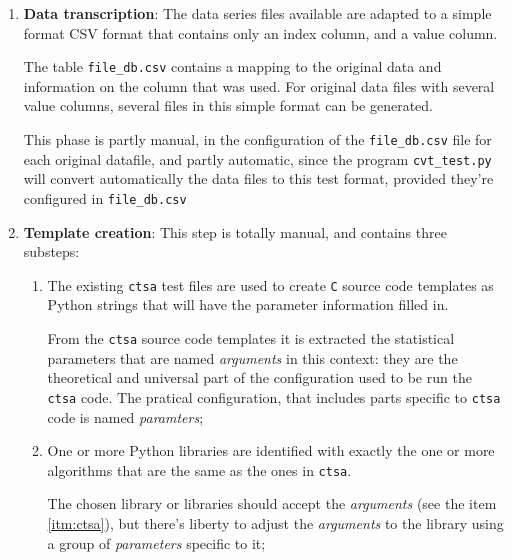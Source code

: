 \documentclass[a4paper,10pt]{article}
\begin{document}
\begin{enumerate}
    \item {\bf Data transcription}: The data series files
        available are adapted to a simple format CSV format that
        contains only an index column, and a value column.

        The table {\tt file\_db.csv} contains a mapping to the
        original data and information on the column that was
        used. For original data files with several value columns,
        several files in this simple format can be generated.

        This phase is partly manual, in the configuration of the
        {\tt file\_db.csv} file for each original datafile, and
        partly automatic, since the program {\tt cvt\_test.py}
        will convert automatically the data files to this test
        format, provided they're configured in {\tt file\_db.csv}

    \item \label{itm:creation_step}
        {\bf Template creation}: This step is totally manual,
        and contains three substeps:

        \begin{enumerate}
            \item \label{itm:ctsa}
                The existing {\tt ctsa} test files are used to
                create {\tt C} source code templates as Python
                strings that will have the parameter information
                filled in.

                From the {\tt ctsa} source code templates it is
                extracted the statistical parameters that are
                named {\em arguments} in this context: they are
                the theoretical and universal part of the
                configuration used to be run the {\tt ctsa} code.
                The pratical configuration, that includes parts
                specific to {\tt ctsa} code is named
                {\em paramters};

            \item \label{itm:Python}
                One or more Python libraries are identified with
                exactly the one or more algorithms that are the
                same as the ones in {\tt ctsa}.

                The chosen library or libraries should accept the
                {\em arguments} (see the item \ref{itm:ctsa}),
                but there's liberty to adjust the {\em arguments}
                to the library using a group of
                {\em parameters} specific to it;


\end{enumerate}
\end{enumerate}
\end{document}
